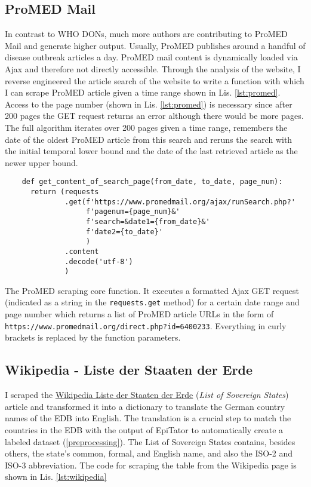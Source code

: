 \subsection{ProMED Mail}
  In contrast to WHO DONs, much more authors are contributing to ProMED Mail and generate higher output.
  Usually, ProMED publishes around a handful of disease outbreak articles a day.
  ProMED mail content is dynamically loaded via Ajax and therefore not directly accessible.
  Through the analysis of the website, I reverse engineered the article search of the website to write a function with which I can scrape ProMED article given a time range shown in Lis. \ref{lst:promed}.
  Access to the page number (shown in Lis. \ref{lst:promed}) is necessary since after 200 pages the GET request returns an error although there would be more pages.
  The full algorithm iterates over 200 pages given a time range, remembers the date of the oldest ProMED article from this search and reruns the search with the initial temporal lower bound and the date of the last retrieved article as the newer upper bound.

  \begin{listing}[h!]
    \begin{verbatim}
    def get_content_of_search_page(from_date, to_date, page_num):
      return (requests
              .get(f'https://www.promedmail.org/ajax/runSearch.php?'
                   f'pagenum={page_num}&'
                   f'search=&date1={from_date}&'
                   f'date2={to_date}'
                   )
              .content
              .decode('utf-8')
              )
    \end{verbatim}
    \caption{The ProMED scraping core function. It executes a formatted Ajax GET request (indicated as a string in the \texttt{requests.get} method) for a certain date range and page number which returns a list of ProMED article URLs in the form of \textquotesingle \texttt{https://www.promedmail.org/direct.php?id=6400233}\textquotesingle. Everything in curly brackets is replaced by the function parameters.}
    \label{lst:promed}
  \end{listing}

\subsection{Wikipedia - Liste der Staaten der Erde}\label{wikipedia}
  I scraped the \href{https://de.wikipedia.org/wiki/Liste_der_Staaten_der_Erde}{Wikipedia Liste der Staaten der Erde} (\textit{List of Sovereign States}) article and transformed it into a dictionary to translate the German country names of the EDB into English.
  The translation is a crucial step to match the countries in the EDB with the output of EpiTator to automatically create a labeled dataset (\ref{preprocessing}).
  The List of Sovereign States contains, besides others, the state's common, formal, and English name, and also the ISO-2 and ISO-3 abbreviation.
  The code for scraping the table from the Wikipedia page is shown in Lis. \ref{lst:wikipedia}


